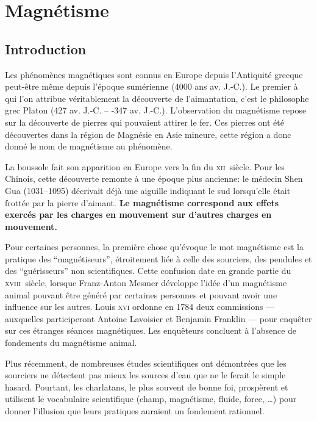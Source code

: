 \chapter{Magnétisme}
\section{Introduction}
Les phénomènes magnétiques sont connus en Europe depuis l'Antiquité grecque peut-être même depuis l'époque sumérienne (4000 ans av. J.-C.). Le premier à qui l'on attribue véritablement la découverte de l'aimantation, c'est le philosophe grec Platon (427 av. J.-C. -- -347 av. J.-C.). L'observation du magnétisme repose sur la découverte de pierres qui pouvaient attirer le fer. Ces pierres ont été découvertes dans la région de Magnésie en Asie mineure, cette région a donc donné le nom de magnétisme au phénomène.

La boussole fait son apparition en Europe vers la fin du \textsc{xii}\ieme~siècle. Pour les Chinois, cette découverte remonte à une époque plus ancienne: le médecin Shen Gua (1031--1095) décrivait déjà une aiguille indiquant le sud lorsqu'elle était frottée par la pierre d'aimant.
\textbf{Le magnétisme correspond aux effets exercés par les charges en mouvement sur d'autres charges en mouvement.}

\newpage

\begin{tcolorbox}[colback=mygray1,breakable,colframe=mygray2,sharp corners=northwest,title={Magnétisme animal, Mesmer et pseudo-sciences}]
    Pour certaines personnes, la première chose qu'évoque le mot magnétisme est la pratique des \enquote{magnétiseurs}, étroitement liée à celle des sourciers, des pendules et des \enquote{guérisseurs} non scientifiques.
    Cette confusion date en grande partie du \textsc{xviii}\ieme~siècle, lorsque Franz-Anton Mesmer développe l'idée d'un magnétisme animal pouvant être généré par certaines personnes et pouvant avoir une influence sur les autres. Louis \textsc{xvi} ordonne en 1784 deux commissions --- auxquelles participeront Antoine Lavoisier et Benjamin Franklin --- pour enquêter sur ces étranges séances magnétiques. Les enquêteurs concluent à l'absence de fondements du magnétisme animal.

    Plus récemment, de nombreuses études scientifiques ont démontrées que les sourciers ne détectent pas mieux les sources d'eau que ne le ferait le simple hasard. Pourtant, les charlatans, le plus souvent de bonne foi, prospèrent et utilisent le vocabulaire scientifique (champ, magnétisme, fluide, force, \ldots) pour donner l'illusion que leurs pratiques auraient un fondement rationnel.
\end{tcolorbox}

